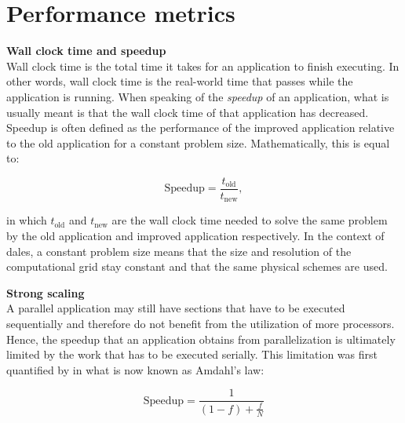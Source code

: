\section{Performance metrics}

\noindent \textbf{Wall clock time and speedup} \\
Wall clock time is the total time it takes for an application to finish executing. In other words, wall clock time is the real-world time that passes while the application is running. When speaking of the \emph{speedup} of an application, what is usually meant is that the wall clock time of that application has decreased. Speedup is often defined as the performance of the improved application relative to the old application for a constant problem size. Mathematically, this is equal to:

\begin{equation}
    \text{Speedup} = \frac{t_{\text{old}}}{t_{\text{new}}},
    \label{eq:speedup}
\end{equation}

in which $t_{\text{old}}$ and $t_{\text{new}}$ are the wall clock time needed to solve the same problem by the old application and improved application respectively. In the context of \acrshort{dales}, a constant problem size means that the size and resolution of the computational grid stay constant and that the same physical schemes are used.

\noindent \textbf{Strong scaling} \\
A parallel application may still have sections that have to be executed sequentially and therefore do not benefit from the utilization of more processors. Hence, the speedup that an application obtains from parallelization is ultimately limited by the work that has to be executed serially. This limitation was first quantified by \citet{amdahlValiditySingleProcessor1967} in what is now known as Amdahl's law: 

\begin{equation}
    \text{Speedup} = \frac{1}{(1-f) + \displaystyle \frac{f}{N}}
    \label{eq:amdahls_law}
\end{equation}

